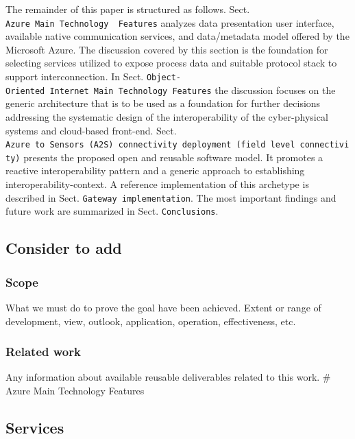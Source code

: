 \documentclass[
]{article}
\begin{document}
The remainder of this paper is structured as follows. Sect.
\texttt{Azure\ Main\ Technology\ \ Features} analyzes data presentation
user interface, available native communication services, and
data/metadata model offered by the Microsoft Azure. The discussion
covered by this section is the foundation for selecting services
utilized to expose process data and suitable protocol stack to support
interconnection. In Sect.
\texttt{Object-Oriented\ Internet\ Main\ Technology\ Features} the
discussion focuses on the generic architecture that is to be used as a
foundation for further decisions addressing the systematic design of the
interoperability of the cyber-physical systems and cloud-based
front-end. Sect.
\texttt{Azure\ to\ Sensors\ (A2S)\ connectivity\ deployment\ (field\ level\ connectivity)}
presents the proposed open and reusable software model. It promotes a
reactive interoperability pattern and a generic approach to establishing
interoperability-context. A reference implementation of this archetype
is described in Sect. \texttt{Gateway\ implementation}. The most
important findings and future work are summarized in Sect.
\texttt{Conclusions}.

\hypertarget{consider-to-add}{%
\subsection{Consider to add}\label{consider-to-add}}

\hypertarget{scope}{%
\subsubsection{Scope}\label{scope}}

What we must do to prove the goal have been achieved. Extent or range of
development, view, outlook, application, operation, effectiveness, etc.

\hypertarget{related-work}{%
\subsubsection{Related work}\label{related-work}}

Any information about available reusable deliverables related to this
work. \# Azure Main Technology Features

\hypertarget{services}{%
\subsection{Services}\label{services}}
\end{document}
